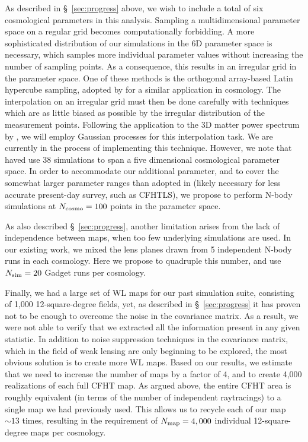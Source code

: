 \documentclass[10pt, preprint]{aastex}
\begin{document}
As described in \S~\ref{sec:progress} above, we wish to include a
total of six cosmological parameters in this analysis.  Sampling a
multidimensional parameter space on a regular grid becomes
computationally forbidding. A more sophisticated distribution of our
simulations in the 6D parameter space is necessary, which samples more
individual parameter values without increasing the number of sampling
points. As a consequence, this results in an irregular grid in the
parameter space. One of these methods is the orthogonal array-based
Latin hypercube sampling, adopted by \cite{CoyoteII} for a similar
application in cosmology.  The interpolation on an irregular grid must
then be done carefully with techniques which are as little biased as
possible by the irregular distribution of the measurement
points. Following the application to the 3D matter power spectrum by
\cite{CoyoteII}, we will employ Gaussian processes for this
interpolation task. We are currently in the process of implementing
this technique.  However, we note that \cite{CoyoteII} haved use 38
simulations to span a five dimensional cosmological parameter
space. In order to accommodate our additional parameter, and to cover
the somewhat larger parameter ranges than adopted in \cite{CoyoteII}
(likely necessary for less accurate present-day survey, such as
CFHTLS), we propose to perform N-body simulations at $N_{\rm
  cosmo}=100$ points in the parameter space.

As also described \S~\ref{sec:progress}, another limitation arises
from the lack of independence between maps, when too few underlying
simulations are used.  In our existing work, we mixed the lens planes
drawn from 5 independent N-body runs in each cosmology. Here we
propose to quadruple this number, and use $N_{\rm sim}=20$ Gadget runs
per cosmology.

Finally, we had a large set of WL maps for our past simulation suite,
consisting of 1,000 12-square-degree fields, yet, as described in
\S~\ref{sec:progress} it has proven not to be enough to overcome the
noise in the covariance matrix. As a result, we were not able to
verify that we extracted all the information present in any given
statistic. In addition to noise suppression techniques in the
covariance matrix, which in the field of weak lensing are only
beginning to be explored, the most obvious solution is to create more
WL maps. Based on our results, we estimate that we need to increase
the number of maps by a factor of 4, and to create 4,000 realizations
of each full CFHT map. As argued above, the entire CFHT area is
roughly equivalent (in terms of the number of independent raytracings)
to a single map we had previously used.  This allows us to recycle
each of our map $\sim 13$ times, resulting in the requirement of
$N_{\rm map}=4,000$ individual 12-square-degree maps per cosmology.
\end{document}
